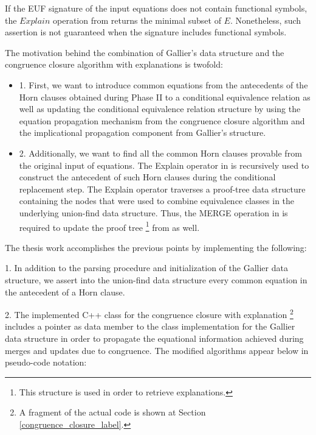 If the EUF signature of the input 
equations does not contain functional symbols, 
the $Explain$ operation from \cite{10.1007/978-3-540-32033-3_33} 
returns the minimal subset of $E$. Nonetheless, such
assertion is not guaranteed when the signature
includes functional symbols.

The motivation behind the combination of 
Gallier's data structure and the congruence 
closure algorithm with explanations is twofold: 

\begin{itemize}
  \item[] 1. First, we want to introduce 
    common equations from the antecedents of 
    the Horn clauses obtained during Phase II
    to a conditional equivalence relation as well
    as updating the conditional equivalence relation 
    structure by using the equation propagation mechanism
    from the congruence closure algorithm and 
    the implicational propagation component 
    from Gallier's structure.
  \item[] 2. Additionally, we want to find all the common
    Horn clauses provable from the original input 
    of equations. The Explain operator in 
    \cite{10.1007/978-3-540-32033-3_33} is recursively 
    used to construct 
    the antecedent of such Horn clauses during the 
    conditional replacement step. The Explain operator 
    traverses a proof-tree data structure containing the nodes
    that were used to combine equivalence classes 
    in the underlying union-find data structure.
    Thus, the MERGE operation in \cite{GALLIER1987233} is
    required to update the proof tree 
    \footnote{This structure is used in order to retrieve
    explanations.}
    from \cite{10.1007/978-3-540-32033-3_33} as well.
\end{itemize}

The thesis work accomplishes the previous
points by implementing the following:

1. In addition to the parsing procedure
and initialization of the Gallier data structure,
we assert into the union-find data structure 
every common equation in the 
antecedent of a Horn clause.

2. The implemented C++ class for 
the congruence closure with explanation 
\footnote{
  A fragment of the actual code is shown
  at Section \ref{congruence_closure_label}.
} 
includes a pointer as data member to the 
class implementation
for the Gallier data structure in order to propagate 
the equational information achieved during
merges and updates due to congruence. The modified 
algorithms appear below in pseudo-code notation:

